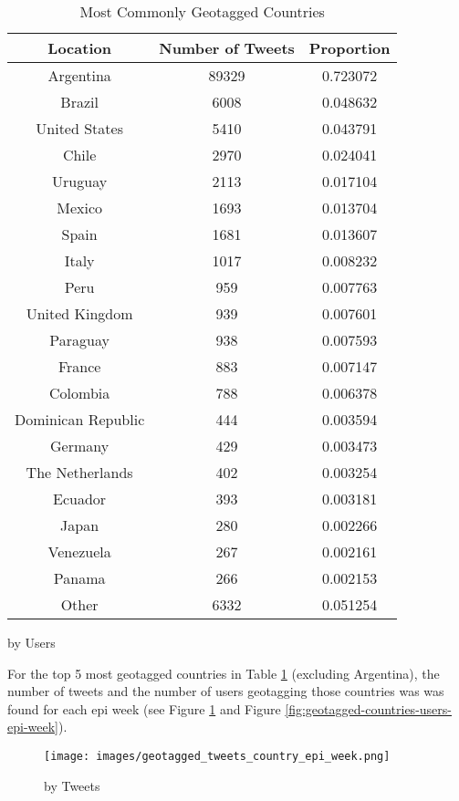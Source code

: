 \begin{table}
\begin{subtable}[c]{0.5\textwidth}
\centering
    \begin{tabular}{|c|c|c|}
    \hline
    Location & Number of Tweets & Proportion \\
    \hline
    Argentina & 89329 & 0.723072 \\
    Brazil & 6008 & 0.048632 \\
    United States & 5410 & 0.043791 \\
    Chile & 2970 & 0.024041 \\
    Uruguay & 2113 & 0.017104 \\
    Mexico & 1693 & 0.013704 \\
    Spain & 1681 & 0.013607 \\
    Italy & 1017 & 0.008232 \\
    Peru & 959 & 0.007763 \\
    United Kingdom & 939 & 0.007601 \\
    Paraguay & 938 & 0.007593 \\
    France & 883 & 0.007147 \\
    Colombia & 788 & 0.006378 \\
    Dominican Republic & 444 & 0.003594 \\
    Germany & 429 & 0.003473 \\
    The Netherlands & 402 & 0.003254 \\
    Ecuador & 393 & 0.003181 \\
    Japan & 280 & 0.002266 \\
    Venezuela & 267 & 0.002161 \\
    Panama & 266 & 0.002153 \\
    Other & 6332 & 0.051254 \\
    \hline
    \end{tabular}
\caption{by Users}
\end{subtable}
\caption{Most Commonly Geotagged Countries}
\label{table:geotagged-countries}
\end{table}

For the top 5 most geotagged countries in Table \ref{table:geotagged-countries} (excluding Argentina), the number of tweets and the number of users geotagging those countries was was found for each epi week (see Figure \ref{fig:geotagged-countries-tweets-epi-week} and Figure \ref{fig:geotagged-countries-users-epi-week}).

\begin{figure}[H]%
    \centering
    \texttt{[image: images/geotagged\_tweets\_country\_epi\_week.png]}
    \caption{by Tweets}
    \label{fig:geotagged-countries-tweets-epi-week}
\end{figure}


